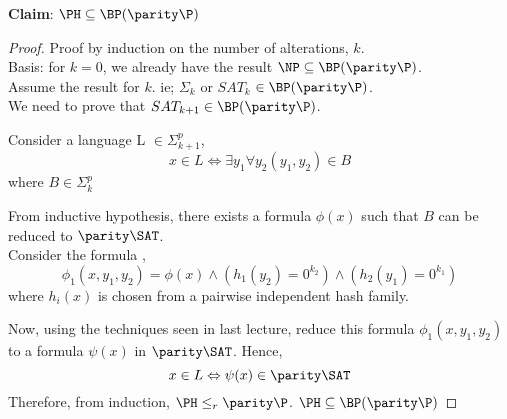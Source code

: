 \documentclass[11pt]{article}
\begin{document}
\textbf{Claim}: $\PH\subseteq\BP(\parity\P)$
\begin{proof} Proof by induction on the number of alterations, $k$.\\
  Basis: for $k=0$, we already have the result
  $\NP\subseteq\BP(\parity\P)$.\\ Assume the result for $k$. ie;
  $\Sigma_k$ or $SAT_k$ $\in \BP(\parity\P)$.\\ We need to prove that
  $SAT_{k+1}\in \BP(\parity\P)$.

  Consider a language L $\in \Sigma_{k+1}^{p}$, 
  $$ x \in L \Leftrightarrow \exists y_{1} \forall y_{2} (y_{1},y_{2}) \in B$$ where $B \in \Sigma_{k}^{p}$
  
  From inductive hypothesis, there exists a formula $\phi(x)$ such that $B$ can be reduced to $\parity \SAT$. \\
  Consider the formula ,
  $$\phi_{1}(x,y_{1},y_{2}) = \phi(x) \wedge (h_{1}(y_{2}) = 0^{k_{2}}) \wedge (h_{2}(y_{1}) = 0^{k_{1}})$$
  where $h_{i}(x)$ is chosen from a pairwise independent hash family. \newline
  
  Now, using the techniques seen in last lecture, reduce this formula $\phi_{1}(x,y_{1},y_{2})$ to a formula $\psi(x)$ in $\parity \SAT$. \newline
  Hence, 
    $$ x \in L \Leftrightarrow \psi(x) \in \parity \SAT$$
    Therefore, from induction, $\PH \leq_{r} \parity \P$.\newline
    $\PH \subseteq \BP(\parity \P)$
  
 \begin{comment} 
 $$\phi\in SAT_k\Rightarrow Pr[\parity_z\phi\land\tau(x,z)]\geq(1-\frac{1}{2^{q(n)}})$$
$$\phi\notin SAT_k\Rightarrow Pr[\parity_z\phi\land\tau(x,z)]\leq \frac{1}{2^{q(n)}}   $$
Now, any $\phi '\in SAT_{k+1}$ can be written as $\phi
'=\exists\sigma$ where $\sigma\in SAT_k$
$$\phi '\in SAT_{k+1}\Rightarrow\exists\sigma\in SAT_k\mbox{ with } \sigma\in\Pi_k$$

Let $\sigma '=\exists(\lnot\varphi)$ where $\sigma=\lnot\varphi$\\
$$\lnot(\forall\varphi)\Rightarrow\exists\sigma\Rightarrow Pr[\sigma '\in\parity SAT]\geq (1-\frac{1}{2^{q(n)}})$$
$$\forall\varphi\Rightarrow\lnot\exists\sigma\Rightarrow Pr[\sigma '\notin\parity SAT]\geq (1-\frac{1}{2^{q(n)}})$$
From inductive hypothesis,
$$\forall\varphi\Rightarrow Pr[\sigma ''\in\parity SAT]\geq (1-\frac{1}{2^{q(n)}})$$
$$\lnot\forall\varphi\Rightarrow Pr[\sigma ''\notin\parity SAT]\geq (1-\frac{1}{2^{q(n)}})$$
$$\varphi\rightarrow\varphi\land(h(y)=0^k)\rightarrow\varphi\land(h(y)=0^{k_1}\land h(x)=0^{k_2})$$
$$\phi=\exists\forall\varphi$$
\end{comment}

\end{proof}
\end{document}
